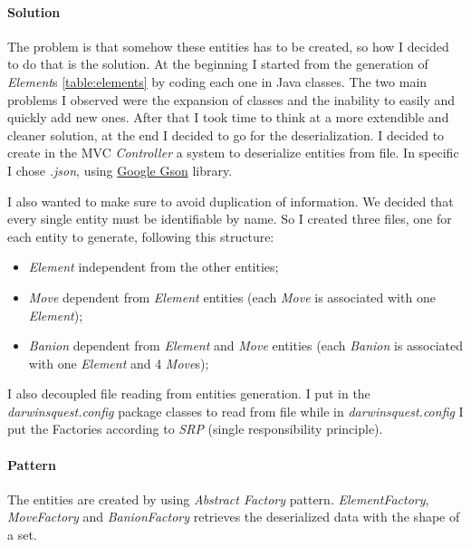 \documentclass[12pt, a4paper]{report}
\theoremstyle{definition}
\begin{document}
            \paragraph{Solution}

            The problem is that somehow these entities has to be created, so how I decided to do that is the solution.
            At the beginning I started from the generation of \emph{Element}s \ref{table:elements} by coding each one in Java classes.
            The two main problems I observed were the expansion of classes and the inability to easily and quickly add new ones.
            After that I took time to think at a more extendible and cleaner solution, at the end I decided to go for the deserialization.
            I decided to create in the MVC \emph{Controller} a system to deserialize entities from file.
            In specific I chose \textit{.json}, using \href{https://github.com/google/gson}{Google Gson} library.
            
            I also wanted to make sure to avoid duplication of information.
            We decided that every single entity must be identifiable by name.
            So I created three files, one for each entity to generate, following this structure:
            \begin{itemize}
                \item \emph{Element} \textrightarrow independent from the other entities;
                \item \emph{Move} \textrightarrow dependent from \emph{Element} entities (each \emph{Move} is associated with one \emph{Element});
                \item \emph{Banion} \textrightarrow dependent from \emph{Element} and \emph{Move} entities (each \emph{Banion} is associated with one \emph{Element} and 4 \emph{Move}s);
            \end{itemize}

            I also decoupled file reading from entities generation.
            I put in the \textit{darwinsquest.config} package classes to read from file while in \textit{darwinsquest.config} I put the Factories according to \emph{SRP} (single responsibility principle).

            \paragraph{Pattern}

            The entities are created by using \emph{Abstract Factory} pattern.
            \emph{ElementFactory}, \emph{MoveFactory} and \emph{BanionFactory} retrieves the deserialized data with the shape of a set.
\end{document}
